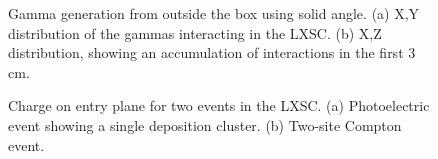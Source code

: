\begin{figure}[!htb]
	\begin{center}
           \caption{\label{fig.gammas} Gamma generation from outside the box using solid angle. (a) X,Y distribution of the gammas interacting in the LXSC. (b) X,Z distribution, showing an accumulation of interactions in the first 3 cm.  }
    \end{center}
\end{figure}

\begin{figure}[!htb]
	\centering
	\caption{\label{fig.events}  Charge on entry plane for two events in the LXSC. (a) Photoelectric event showing a single deposition cluster. (b) Two-site Compton event.}
\end{figure}

